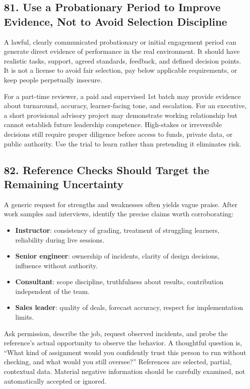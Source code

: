 \subsection*{81. Use a Probationary Period to Improve Evidence, Not to Avoid Selection Discipline}

A lawful, clearly communicated probationary or initial engagement period can generate direct evidence of performance in the real environment. It should have realistic tasks, support, agreed standards, feedback, and defined decision points. It is not a license to avoid fair selection, pay below applicable requirements, or keep people perpetually insecure.

For a part-time reviewer, a paid and supervised 1st batch may provide evidence about turnaround, accuracy, learner-facing tone, and escalation. For an executive, a short provisional advisory project may demonstrate working relationship but cannot establish future leadership competence. High-stakes or irreversible decisions still require proper diligence before access to funds, private data, or public authority. Use the trial to learn rather than pretending it eliminates risk.

\subsection*{82. Reference Checks Should Target the Remaining Uncertainty}

A generic request for strengths and weaknesses often yields vague praise. After work samples and interviews, identify the precise claims worth corroborating:
\begin{itemize}[leftmargin=*]
\item \textbf{Instructor}: consistency of grading, treatment of struggling learners, reliability during live sessions.
\item \textbf{Senior engineer}: ownership of incidents, clarity of design decisions, influence without authority.
\item \textbf{Consultant}: scope discipline, truthfulness about results, contribution independent of the team.
\item \textbf{Sales leader}: quality of deals, forecast accuracy, respect for implementation limits.
\end{itemize}

Ask permission, describe the job, request observed incidents, and probe the reference's actual opportunity to observe the behavior. A thoughtful question is, ``What kind of assignment would you confidently trust this person to run without checking, and what would you still oversee?'' References are selected, partial, contextual data. Material negative information should be carefully examined, not automatically accepted or ignored.

